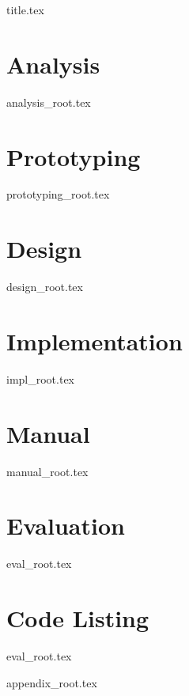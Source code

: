 \documentclass[a4paper, 12pt]{scrartcl}
\begin{document}
{title.tex}

\begin{footnotesize}
\tableofcontents
\end{footnotesize}

\pagebreak

\section{Analysis}
{analysis_root.tex}
\pagebreak

\section{Prototyping}
{prototyping_root.tex}
\pagebreak

\section{Design}
{design_root.tex}
\pagebreak

\section{Implementation}
{impl_root.tex}
\pagebreak

\section{Manual}
{manual_root.tex}
\pagebreak

\section{Evaluation}
{eval_root.tex}
\pagebreak

\section{Code Listing}
{eval_root.tex}
\pagebreak

\appendix
{}
{appendix_root.tex}
\end{document}
